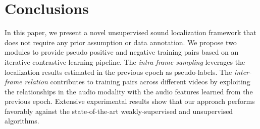\vspace{-2mm}
\section{Conclusions}
\vspace{\secmargin}
\label{sec:conclusions}
In this paper, we present a novel unsupervised sound localization framework that does not require any prior assumption or data annotation.
%
We propose two modules to provide pseudo positive and negative training pairs based on an iterative contrastive learning pipeline.
The \textit{intra-frame sampling} leverages the localization results estimated in the previous epoch as pseudo-labels.
The \textit{inter-frame relation} contributes  to training pairs across different videos by exploiting the relationships in the audio modality with the audio features learned from the previous epoch.
%
%
% 
% 
% 
%
Extensive experimental results show that our approach performs favorably against the state-of-the-art weakly-supervised and unsupervised algorithms.
